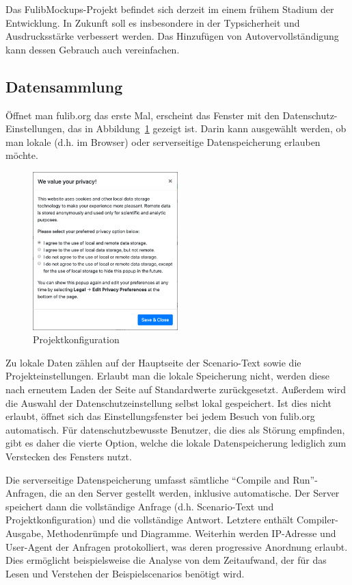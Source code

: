 Das FulibMockups-Projekt befindet sich derzeit im einem frühem Stadium der Entwicklung.
In Zukunft soll es insbesondere in der Typsicherheit und Ausdrucksstärke verbessert werden.
Das Hinzufügen von Autovervollständigung kann dessen Gebrauch auch vereinfachen.

\subsection{Datensammlung}\label{subsec:data-collection}

Öffnet man fulib.org das erste Mal, erscheint das Fenster mit den Datenschutz-Einstellungen, das in Abbildung~\ref{fig:privacy} gezeigt ist.
Darin kann ausgewählt werden, ob man lokale (d.h. im Browser) oder serverseitige Datenspeicherung erlauben möchte.

\begin{figure}
    \centering
    \includegraphics[width=0.5\textwidth]{chapter/fulib.org/img/privacy.png}
    \caption{Projektkonfiguration}
    \label{fig:privacy}
\end{figure}

Zu lokale Daten zählen auf der Hauptseite der Scenario-Text sowie die Projekteinstellungen.
Erlaubt man die lokale Speicherung nicht, werden diese nach erneutem Laden der Seite auf Standardwerte zurückgesetzt.
Außerdem wird die Auswahl der Datenschutzeinstellung selbst lokal gespeichert.
Ist dies nicht erlaubt, öffnet sich das Einstellungsfenster bei jedem Besuch von fulib.org automatisch.
Für datenschutzbewusste Benutzer, die dies als Störung empfinden, gibt es daher die vierte Option,
welche die lokale Datenspeicherung lediglich zum Verstecken des Fensters nutzt.

Die serverseitige Datenspeicherung umfasst sämtliche ``Compile and Run''-Anfragen, die an den Server gestellt werden, inklusive automatische.
Der Server speichert dann die vollständige Anfrage (d.h. Scenario-Text und Projektkonfiguration) und die vollständige Antwort.
Letztere enthält Compiler-Ausgabe, Methodenrümpfe und Diagramme.
Weiterhin werden IP-Adresse und User-Agent der Anfragen protokolliert, was deren progressive Anordnung erlaubt.
Dies ermöglicht beispielsweise die Analyse von dem Zeitaufwand, der für das Lesen und Verstehen der Beispielscenarios benötigt wird.

